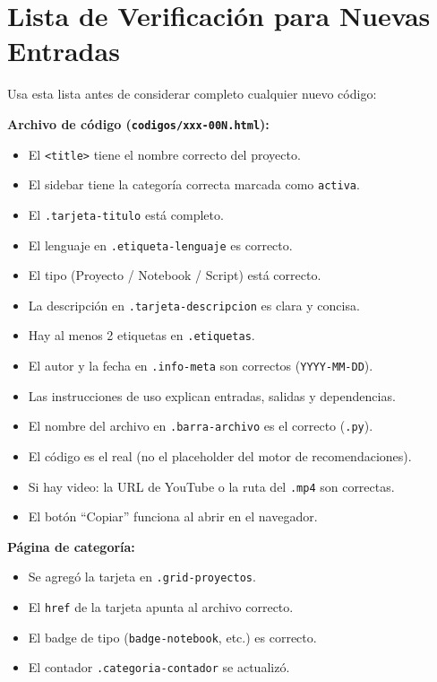 \documentclass[12pt, a4paper]{article}
\newcommand{\archivo}[1]{\texttt{\textcolor{cpAccent}{#1}}}
\newcommand{\clase}[1]{\texttt{\textcolor{cpAzul}{.#1}}}
\begin{document}
\section{Lista de Verificación para Nuevas Entradas}

Usa esta lista antes de considerar completo cualquier nuevo código:

\textbf{Archivo de código (\archivo{codigos/xxx-00N.html}):}
\begin{itemize}[leftmargin=1.5em, label={\(\square\)}]
    \item El \texttt{<title>} tiene el nombre correcto del proyecto.
    \item El sidebar tiene la categoría correcta marcada como \texttt{activa}.
    \item El \clase{tarjeta-titulo} está completo.
    \item El lenguaje en \clase{etiqueta-lenguaje} es correcto.
    \item El tipo (Proyecto / Notebook / Script) está correcto.
    \item La descripción en \clase{tarjeta-descripcion} es clara y concisa.
    \item Hay al menos 2 etiquetas en \clase{etiquetas}.
    \item El autor y la fecha en \clase{info-meta} son correctos (\texttt{YYYY-MM-DD}).
    \item Las instrucciones de uso explican entradas, salidas y dependencias.
    \item El nombre del archivo en \clase{barra-archivo} es el correcto (\texttt{.py}).
    \item El código es el real (no el placeholder del motor de recomendaciones).
    \item Si hay video: la URL de YouTube o la ruta del \texttt{.mp4} son correctas.
    \item El botón ``Copiar'' funciona al abrir en el navegador.
\end{itemize}

\textbf{Página de categoría:}
\begin{itemize}[leftmargin=1.5em, label={\(\square\)}]
    \item Se agregó la tarjeta en \clase{grid-proyectos}.
    \item El \texttt{href} de la tarjeta apunta al archivo correcto.
    \item El badge de tipo (\texttt{badge-notebook}, etc.) es correcto.
    \item El contador \clase{categoria-contador} se actualizó.
\end{itemize}
\end{document}
